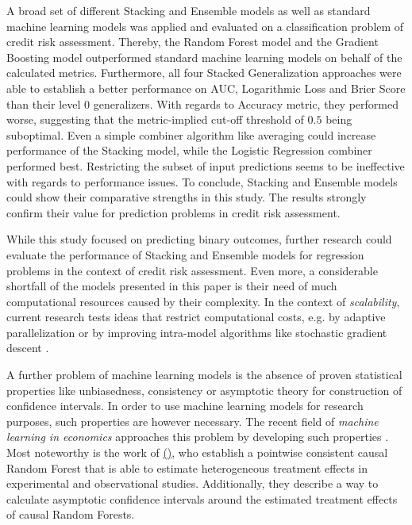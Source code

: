 \documentclass[12pt]{article}
\begin{document}
A broad set of different Stacking and Ensemble models as well as standard machine learning models was applied and evaluated on a classification problem of credit risk assessment. Thereby, the Random Forest model and the Gradient Boosting model outperformed standard machine learning models on behalf of the calculated metrics. Furthermore, all four Stacked Generalization approaches were able to establish a better performance on AUC, Logarithmic Loss and Brier Score than their level 0 generalizers. With regards to Accuracy metric, they performed worse, suggesting that the metric-implied cut-off threshold of $0.5$ being suboptimal. Even a simple combiner algorithm like averaging could increase performance of the Stacking model, while the Logistic Regression combiner performed best. Restricting the subset of input predictions seems to be ineffective with regards to performance issues. To conclude, Stacking and Ensemble models could show their comparative strengths in this study. The results strongly confirm their value for prediction problems in credit risk assessment.

While this study focused on predicting binary outcomes, further research could evaluate the performance of Stacking and Ensemble models for regression problems in the context of credit risk assessment. Even more, a considerable shortfall of the models presented in this paper is their need of much computational resources caused by their complexity. In the context of \textit{scalability}, current research tests ideas that restrict computational costs, e.g. by adaptive parallelization \citep{li2014communication} or by improving intra-model algorithms like stochastic gradient descent \citep{bottou2012stochastic}. 

 A further problem of machine learning models is the absence of proven statistical properties like unbiasedness, consistency or asymptotic theory for construction of confidence intervals. In order to use machine learning models for research purposes, such properties are however necessary. The recent field of \textit{machine learning in economics} approaches this problem by developing such properties \citep[cp.][]{athey2017impact}. Most noteworthy is the work of \citeauthor{wager2018est} \hyperlink{wager2018est}{(\color{Black}{in press})}, who establish a pointwise consistent causal Random Forest that is able to estimate heterogeneous treatment effects in experimental and observational studies. Additionally, they describe a way to calculate asymptotic confidence intervals around the estimated treatment effects of causal Random Forests.
\end{document}
